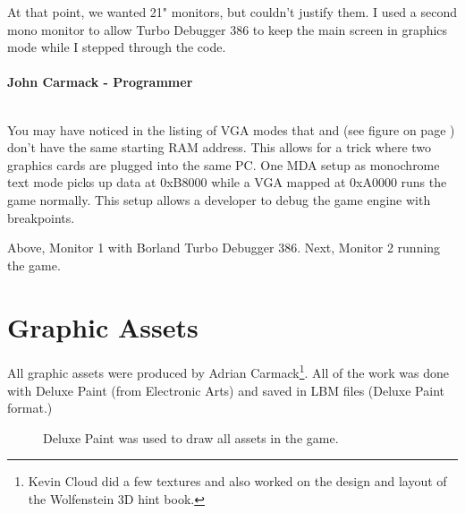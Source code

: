 \documentclass[book.tex]{subfiles}
\begin{document}
\begin{fancyquotes}
At that point, we wanted 21" monitors, but couldn't justify them.  I used a second mono monitor to allow Turbo Debugger 386 to keep the main screen in graphics mode while I stepped through the code.\\
 \\
\textbf{John Carmack - Programmer}
\end{fancyquotes}
\\
You may have noticed in the listing of VGA modes that  and  (see figure on page \pageref{fig:vga_modes})  don't have the same starting RAM address. This allows for a trick where two graphics cards are plugged into the same PC. One MDA setup as monochrome text mode picks up data at 0xB8000 while a VGA mapped at 0xA0000 runs the game normally. This setup allows a developer to debug the game engine with breakpoints.\\
\par
\begin{figure}[H]
  \centering

\end{figure}

Above, Monitor 1 with Borland Turbo Debugger 386. Next, Monitor 2 running the game.

\begin{figure}[H]
\centering

\end{figure}



 
 
 




\section{Graphic Assets}

All graphic assets were produced by Adrian Carmack\footnote{Kevin Cloud did a few textures and also worked on the design and layout of the Wolfenstein 3D hint book.}. All of the work was done with Deluxe Paint (from Electronic Arts) and saved in LBM files (Deluxe Paint format.) 

\begin{figure}[H]
  \centering
 \caption{Deluxe Paint was used to draw all assets in the game.}
\end{figure}
\end{document}
